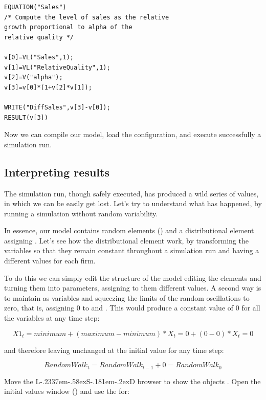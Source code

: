 \documentclass [11pt,a4paper] {book}
\def\LsD{{L\kern-.2337em\lower-.58ex\hbox{S}\kern-.181em\lower-.2ex\hbox{D}}\xspace}
\begin{document}
\begin{minipage}[h]{10cm}
\small
\begin{verbatim}
EQUATION("Sales")
/* Compute the level of sales as the relative
growth proportional to alpha of the
relative quality */

v[0]=VL("Sales",1);
v[1]=VL("RelativeQuality",1);
v[2]=V("alpha");
v[3]=v[0]*(1+v[2]*v[1]);

WRITE("DiffSales",v[3]-v[0]);
RESULT(v[3])

\end{verbatim}
\normalsize
\end{minipage}


Now we can compile our model, load the configuration, and execute successfully a
simulation run.

\subsection{Interpreting results}

The simulation run, though safely executed, has produced a wild series of values, in
which we can be easily get lost. Let's try to understand what has happened, by running a
simulation without random variability.

In essence, our model contains random elements () and a distributional
element assigning . Let's see  how the distributional element work, by transforming the  variables so that they remain constant throughout a simulation run and having a different values for each firm. 

To do this we can simply edit the structure of the model editing the elements  and turning them into parameters, assigning to them different values. A second way is to maintain  as variables and squeezing the limits of the random oscillations to zero, that is, assigning 0 to
 and . This would produce a constant value of 0 for all the
 variables at any time step:

$$X1_t=minimum+(maximum-minimum)*X_t=0+(0-0)*X_t=0$$

and therefore leaving unchanged  at the initial value for any time step:

$$RandomWalk_t = RandomWalk_{t-1}+0=RandomWalk_{0}$$


Move the \LsD browser to show the objects . Open the initial values window
() and use the  for:
\end{document}
